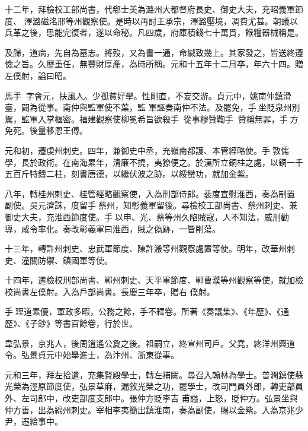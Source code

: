 \begin{pinyinscope}
 十二年，拜檢校工部尚書，代郗士美為潞州大都督府長史、御史大夫，充昭義軍節度、
 澤潞磁洺邢等州觀察使。是時以再討王承宗，澤潞壓境，凋費尤甚。朝議以兵革之後，思能完復者，遂以命秘。凡四歲，府庫積錢七十萬貫，餱糧器械稱是。



 及歸，道病，先自為墓志。將歿，又為書一通，命緘致幾上。其家發之，皆送終遵儉之旨。久歷重任，無豐財厚產，為時所稱。元和十五年十二月卒，年六十四。贈左僕射，謚曰昭。



 馬手，字會元，扶風人。少孤貧好學。性剛直，不妄交游。貞元中，姚南仲鎮滑臺，闢為從事。南仲與監軍使不葉，監
 軍誣奏南仲不法。及罷免，手坐貶泉州別駕，監軍入掌樞密。福建觀察使柳冕希旨欲殺手，從事穆贊鞫手，贊稱無罪，手方免死。後量移恩王傅。



 元和初，遷虔州刺史。四年，兼御史中丞，充嶺南都護、本管經略使。手敦儒學，長於政術。在南海累年，清廉不撓，夷獠便之。於漢所立銅柱之處，以銅一千五百斤特鑄二柱，刻書唐德，以繼伏波之跡。以綏蠻功，就加金紫。



 八年，轉桂州刺史、桂管經略觀察使，入為刑部侍郎。裴度宣慰淮西，奏為制置
 副使。吳元濟誅，度留手蔡州，知彰義軍留後。尋檢校工部尚書、蔡州刺史、兼御史大夫，充淮西節度使。手以申、光、蔡等州久陷賊寇，人不知法，威刑勸導，咸令率化。奏改彰義軍曰淮西，賊之偽跡，一皆削蕩。



 十三年，轉許州刺史、忠武軍節度、陳許溵等州觀察處置等使。明年，改華州刺史、潼關防禦、鎮國軍等使。



 十四年，遷檢校刑部尚書、鄆州刺史、天平軍節度、鄆曹濮等州觀察等使，就加檢校尚書左僕射。入為戶部尚書。長慶三年卒，贈右
 僕射。



 手理道素優，軍政多暇，公務之餘，手不釋卷。所著《奏議集》、《年歷》、《通歷》、《子鈔》等書百餘卷，行於世。



 韋弘景，京兆人，後周逍遙公夐之後。祖嗣立，終宣州司戶。父堯，終洋州興道令。弘景貞元中始舉進士，為汴州、浙東從事。



 元和三年，拜左拾遺，充集賢殿學士，轉左補闕。尋召入翰林為學士。普潤鎮使蘇光榮為涇原節度使，弘景草麻，漏敘光榮之功，罷學士，改司門員外郎，轉吏部員外、左司郎中，改吏部度支郎中。張仲方貶李吉
 甫謚，上怒，貶仲方。弘景坐與仲方善，出為綿州刺史。宰相李夷簡出鎮淮南，奏為副使，賜以金紫。入為京兆少尹，遷給事中。




\end{pinyinscope}
